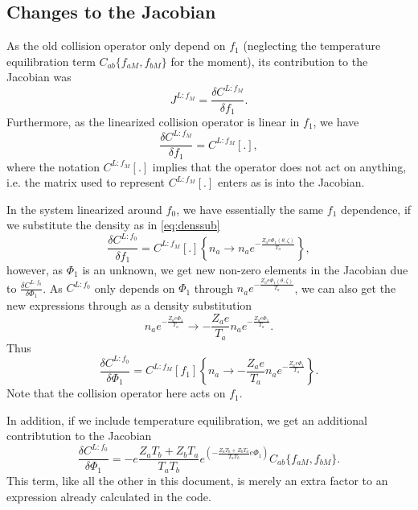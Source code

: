 \documentclass[12pt]{article}
\begin{document}
\subsection*{Changes to the Jacobian}
As the old collision operator only depend on $f_{1}$ (neglecting the temperature equilibration term $C_{ab}\{f_{aM},f_{bM}\}$ for the moment), its contribution to the Jacobian was
\begin{equation}
J^{L:f_M} = \frac{\delta C^{L:f_M}}{\delta f_{1}}.
\end{equation}
Furthermore, as the linearized collision operator is linear in $f_{1}$, we have
\begin{equation}
\frac{\delta C^{L:f_M}}{\delta f_{1}} =  C^{L:f_M}[.],
\end{equation}
where the notation $C^{L:f_M}[.]$ implies that the operator does not act on anything, i.e. the matrix used to represent $C^{L:f_M}[.]$ enters as is into the Jacobian.

In the system linearized around $f_0$, we have essentially the same $f_1$ dependence, if we substitute the density as in \eqref{eq:denssub}
\begin{equation}
\frac{\delta C^{L:f_0}}{\delta f_{1}} =  C^{L:f_M}[.] \left\{n_a \to n_a e^{-\frac{Z_a e\Phi_1(\theta,\zeta)}{T_a}}\right\},
\end{equation}
however, as $\Phi_1$ is an unknown, we get new non-zero elements in the Jacobian due to $\frac{\delta C^{L:f_0}}{\delta \Phi_{1}}$.
As $C^{L:f_0}$ only depends on $\Phi_1$ through $n_a e^{-\frac{Z_a e\Phi_1(\theta,\zeta)}{T_a}}$, we can also get the new expressions through as a density substitution
\begin{equation}
n_a e^{-\frac{Z_a e\Phi_1}{T_a}} \to  -\frac{Z_a e}{T_a} n_a e^{-\frac{Z_a e\Phi_1}{T_a}}.
\end{equation}
Thus
\begin{equation}
\frac{\delta C^{L:f_0}}{\delta \Phi_{1}} =  C^{L:f_M}[f_1] \left\{n_a \to -\frac{Z_a e}{T_a} n_a e^{-\frac{Z_a e\Phi_1}{T_a}}\right\}.
\end{equation}
Note that the collision operator here acts on $f_1$.

In addition, if we include temperature equilibration, we get an additional contribtution to the Jacobian
\begin{equation}
\frac{\delta C^{L:f_0}}{\delta \Phi_{1}} =  -e\frac{Z_a T_b + Z_b T_a}{T_a T_b} e^{\left(-\frac{Z_a T_b + Z_b T_a}{T_a T_b} e\Phi_1\right)} C_{ab}\{f_{aM},f_{bM}\}.
\end{equation}
This term, like all the other in this document, is merely an extra factor to an expression already calculated in the code.
\end{document}
